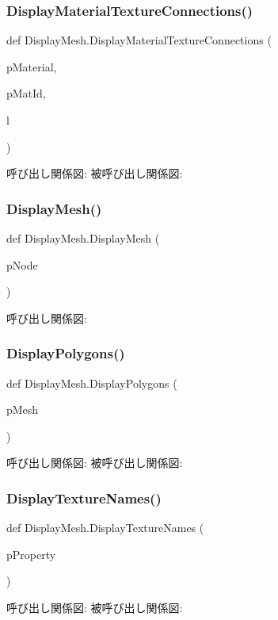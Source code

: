 \subsubsection{\texorpdfstring{Display\+Material\+Texture\+Connections()}{DisplayMaterialTextureConnections()}}
{\footnotesize\ttfamily def Display\+Mesh.\+Display\+Material\+Texture\+Connections (\begin{DoxyParamCaption}\item[{}]{p\+Material,  }\item[{}]{p\+Mat\+Id,  }\item[{}]{l }\end{DoxyParamCaption})}

呼び出し関係図\+:
被呼び出し関係図\+:
\mbox{\label{namespace_display_mesh_ad7aad925c6b08488410a66263097aa1f}} 
\subsubsection{\texorpdfstring{Display\+Mesh()}{DisplayMesh()}}
{\footnotesize\ttfamily def Display\+Mesh.\+Display\+Mesh (\begin{DoxyParamCaption}\item[{}]{p\+Node }\end{DoxyParamCaption})}

呼び出し関係図\+:
\mbox{\label{namespace_display_mesh_a12110409bb6a31e9740575ed9606c56e}} 
\subsubsection{\texorpdfstring{Display\+Polygons()}{DisplayPolygons()}}
{\footnotesize\ttfamily def Display\+Mesh.\+Display\+Polygons (\begin{DoxyParamCaption}\item[{}]{p\+Mesh }\end{DoxyParamCaption})}

呼び出し関係図\+:
被呼び出し関係図\+:
\mbox{\label{namespace_display_mesh_a8bf1b1ac655964fda10b9e6cf1c53689}} 
\subsubsection{\texorpdfstring{Display\+Texture\+Names()}{DisplayTextureNames()}}
{\footnotesize\ttfamily def Display\+Mesh.\+Display\+Texture\+Names (\begin{DoxyParamCaption}\item[{}]{p\+Property }\end{DoxyParamCaption})}

呼び出し関係図\+:
被呼び出し関係図\+:
